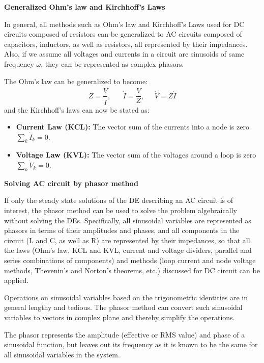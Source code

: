 \documentclass{article}
\begin{document}
{\bf Generalized Ohm's law and Kirchhoff's Laws}

In general, all methods such as Ohm's law and Kirchhoff's Laws used for DC 
circuits composed of resistors can be generalized to AC circuits composed 
of capacitors, inductors, as well as resistors, all represented by their
impedances. Also, if we assume all voltages and currents in a circuit are 
sinusoids of same frequency $\omega$, they can be represented as complex 
phasors.

The Ohm's law can be generalized to become:
\begin{equation} 
  Z=\frac{\dot{V}}{\dot{I}},\;\;\;\;\;\;\dot{I}=\frac{\dot{V}}{Z},
  \;\;\;\;\;\dot{V}=Z\dot{I} 
\end{equation}
and the Kirchhoff's laws can now be stated as:
\begin{itemize}
\item {\bf Current Law (KCL):} The vector sum of the currents into a node
  is zero $\sum_k \dot{I}_k=0$.
\item {\bf Voltage Law (KVL):} The vector sum of the voltages around a loop 
  is zero $\sum_k \dot{V}_k=0$.
\end{itemize}


{\bf Solving AC circuit by phasor method}

If only the steady state solutions of the DE describing an AC circuit is of 
interest, the phasor method can be used to solve the problem algebraically 
without solving the DEs. Specifically, all sinusoidal variables are represented 
as phasors in terms of their amplitudes and phases, and all components in the 
circuit (L and C, as well as R) are represented by their impedances, so that 
all the laws (Ohm's law, KCL and KVL, current and voltage dividers, parallel 
and series combinations of components) and methods (loop current and node 
voltage methods, Thevenin's and Norton's theorems, etc.) discussed for DC 
circuit can be applied.


Operations on sinusoidal variables based on the trigonometric identities
are in general lengthy and tedious. The phasor method can convert such 
sinusoidal variables to vectors in complex plane and thereby simplify the 
operations. 

The phasor represents the amplitude (effective or RMS value) and phase of a 
sinusoidal function, but leaves out its frequency as it is known to be the
same for all sinusoidal variables in the system.
\end{document}
